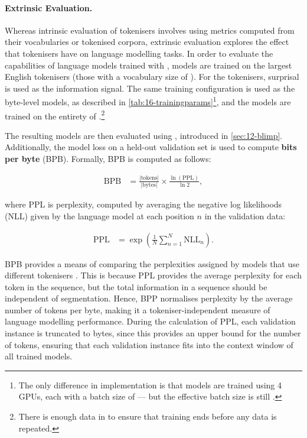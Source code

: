 \paragraph{Extrinsic Evaluation.} 

Whereas intrinsic evaluation of tokenisers involves using metrics computed from their vocabularies or tokenised corpora, extrinsic evaluation explores the effect that tokenisers have on language modelling tasks. In order to evaluate the capabilities of language models trained with \bytespan, \llama models are trained on the largest English tokenisers (those with a vocabulary size of ). For the \bytespan tokenisers, surprisal is used as the information signal. The same training configuration is used as the byte-level models, as described in \cref{tab:16-trainingparams}\footnote{The only difference in implementation is that models are trained using 4 GPUs, each with a batch size of  --- but the effective batch size is still .}, and the models are trained on the entirety of \fineweb.\footnote{There is enough data in \fineweb to ensure that training ends before any data is repeated.}

The resulting models are then evaluated using \blimp, introduced in \cref{sec:12-blimp}. Additionally, the model loss on a held-out validation set is used to compute \textbf{bits per byte} (BPB). Formally, BPB is computed as follows:

\begin{align}
    \mathrm{BPB} &= \frac{|\mathrm{tokens}|}{|\mathrm{bytes}|} \times \frac{\ln(\mathrm{PPL})}{\ln{2}},
\end{align}

where PPL is perplexity, computed by averaging the negative log likelihoods (NLL) given by the language model at each position $n$ in the validation data:

\begin{align}
    \mathrm{PPL} &= \exp{\left(\frac{1}{N} \sum_{n=1}^{N}{\mathrm{NLL}_n} \right)}.
\end{align}

BPB provides a means of comparing the perplexities assigned by models that use different tokenisers  \citep{choe2019bridging}. This is because PPL provides the average perplexity for each token in the sequence, but the total information in a sequence should be independent of segmentation. Hence, BPP normalises perplexity by the average number of tokens per byte, making it a tokeniser-independent measure of language modelling performance. During the calculation of PPL, each validation instance is truncated to  bytes, since this provides an upper bound for the number of tokens, ensuring that each validation instance fits into the context window of all trained models.

